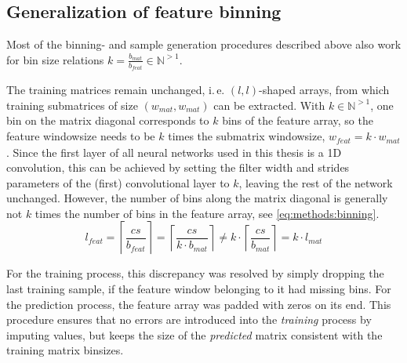 \subsection{Generalization of feature binning} \label{sec:methods:inputBinning}
Most of the binning- and sample generation procedures described above 
also work for bin size relations $k=\frac{b_\mathit{mat}}{b_\mathit{feat}} \in \mathbb{N}^{>1}$.

The training matrices remain unchanged, i.\,e. $(l, l)$-shaped arrays, from which training submatrices of size  $(w_\mathit{mat}, w_\mathit{mat})$
can be extracted. 
With $k \in \mathbb{N}^{>1}$, one bin on the matrix diagonal corresponds to $k$ bins of the feature array,
so the feature windowsize needs to be $k$ times the submatrix windowsize, $w_\mathit{feat} = k \cdot w_\mathit{mat}$.
Since the first layer of all neural networks used in this thesis is a 1D convolution,
this can be achieved by setting the filter width and strides parameters of the (first) convolutional layer to $k$, leaving the rest of the network unchanged.
However, the number of bins along the matrix diagonal is generally not $k$ times the number of bins in the feature array,
see \cref{eq:methods:binning}.
\begin{equation}
 l_\mathit{feat} = \left \lceil{\frac{cs}{b_\mathit{feat}}}\right \rceil
                = \left \lceil{\frac{cs}{k \cdot b_\mathit{mat}}}\right \rceil 
                \not = k \cdot \left \lceil{\frac{cs}{ b_\mathit{mat}}}\right \rceil
                = k \cdot l_\mathit{mat} \label{eq:methods:binning}
\end{equation}

For the training process, this discrepancy was resolved by simply dropping the last training sample, 
if the feature window belonging to it had missing bins.
For the prediction process, the feature array was padded with zeros on its end.
This procedure ensures that no errors are introduced into the \emph{training} process by imputing values,
but keeps the size of the \emph{predicted} matrix consistent with the training matrix binsizes.

